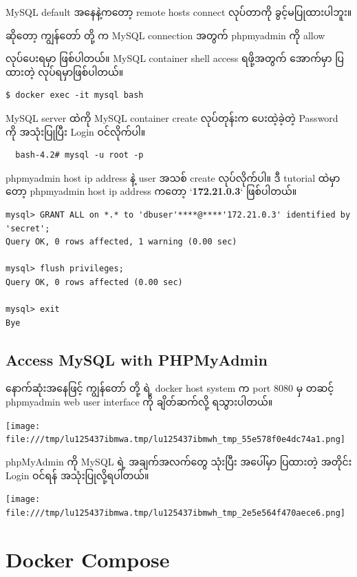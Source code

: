 \documentclass{article}
\begin{document}
MySQL default အနေနဲ့ကတော့ remote hosts connect လုပ်တာကို
ခွင့်မပြုထားပါဘူး။

ဆိုတော့ ကျွန်တော် တို့ က MySQL connection အတွက် phpmyadmin ကို allow

လုပ်ပေးရမှာ ဖြစ်ပါတယ်။ MySQL container shell access ရဖို့အတွက် အောက်မှာ
ပြထားတဲ့ လုပ်ရမှာဖြစ်ပါတယ်။

\begin{verbatim}
$ docker exec -it mysql bash
\end{verbatim}

MySQL server ထဲကို MySQL container create လုပ်တုန်းက ပေးထဲ့ခဲ့တဲ့
Password ကို အသုံးပြုပြီး Login ဝင်လိုက်ပါ။

\begin{verbatim}
  bash-4.2# mysql -u root -p
\end{verbatim}

phpmyadmin host ip address နဲ့ user အသစ် create လုပ်လိုက်ပါ။ ဒီ tutorial
ထဲမှာတော့ phpmyadmin host ip address ကတော့ `\textbf{172.21.0.3}`
ဖြစ်ပါတယ်။

\begin{verbatim}
mysql> GRANT ALL on *.* to 'dbuser'****@****'172.21.0.3' identified by 'secret';
Query OK, 0 rows affected, 1 warning (0.00 sec)

mysql> flush privileges;
Query OK, 0 rows affected (0.00 sec)

mysql> exit
Bye
\end{verbatim}

\subsection{Access MySQL with
PHPMyAdmin}\label{access-mysql-with-phpmyadmin}

နောက်ဆုံးအနေဖြင့် ကျွန်တော် တို့ ရဲ့ docker host system က port 8080 မှ
တဆင့် phpmyadmin web user interface ကို ချိတ်ဆက်လို့ ရသွားပါတယ်။

\texttt{[image: file:///tmp/lu125437ibmwa.tmp/lu125437ibmwh\_tmp\_55e578f0e4dc74a1.png]}

phpMyAdmin ကို MySQL ရဲ့ အချက်အလက်တွေ သုံးပြီး အပေါ်မှာ ပြထားတဲ့ အတိုင်း
Login ဝင်ရန် အသုံးပြုလို့ရပါတယ်။

\texttt{[image: file:///tmp/lu125437ibmwa.tmp/lu125437ibmwh\_tmp\_2e5e564f470aece6.png]}

\pagebreak

\section{Docker Compose}\label{docker-compose}
\end{document}
